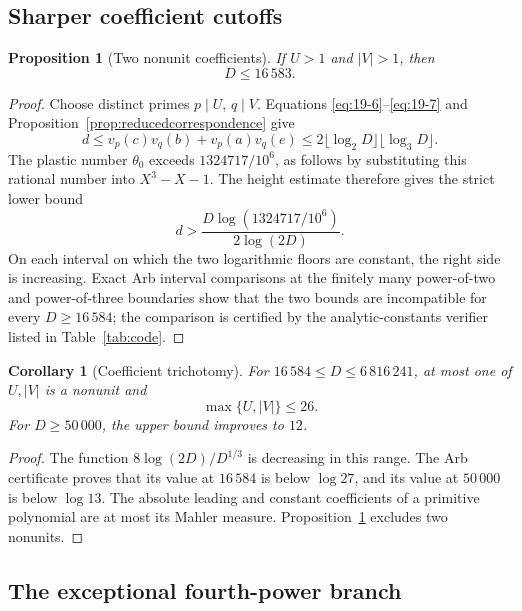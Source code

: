 \documentclass[11pt]{article}
\numberwithin{equation}{section}
\newtheorem{proposition}[theorem]{Proposition}
\newtheorem{corollary}[theorem]{Corollary}
\theoremstyle{definition}
\begin{document}
\subsection{Sharper coefficient cutoffs}

\begin{proposition}[Two nonunit coefficients]\label{prop:twononunit}
If \(U>1\) and \(|V|>1\), then
\begin{equation}
 \boxed{D\leq16\,583.}
 \label{eq:19-9}
\end{equation}
\end{proposition}

\begin{proof}
Choose distinct primes \(p\mid U\), \(q\mid V\).  Equations
\eqref{eq:19-6}--\eqref{eq:19-7} and Proposition~\ref{prop:reducedcorrespondence} give
\[
 d\leq v_p(c)v_q(b)+v_p(a)v_q(e)
 \leq2\lfloor\log_2D\rfloor\lfloor\log_3D\rfloor.
\]
The plastic number \(\theta_0\) exceeds
\(1324717/10^6\), as follows by substituting this rational number into
\(X^3-X-1\).  The height estimate therefore gives the strict lower bound
\[
 d>
 \frac{D\log(1324717/10^6)}{2\log(2D)}.
\]
On each interval on which the two logarithmic floors are constant, the right
side is increasing.  Exact Arb interval comparisons at the finitely many
power-of-two and power-of-three boundaries show that the two bounds are
incompatible for every \(D\geq16\,584\); the comparison is certified by the
analytic-constants verifier listed in Table~\ref{tab:code}.
\end{proof}

\begin{corollary}[Coefficient trichotomy]\label{cor:coefftrichotomy}
For \(16\,584\leq D\leq6\,816\,241\), at most one of \(U,|V|\) is a
nonunit and
\[
 \max\{U,|V|\}\leq26.
\]
For \(D\geq50\,000\), the upper bound improves to \(12\).
\end{corollary}

\begin{proof}
The function \(8\log(2D)/D^{1/3}\) is decreasing in this range.  The Arb
certificate proves that its value at \(16\,584\) is below \(\log27\), and
its value at \(50\,000\) is below \(\log13\).  The absolute leading and
constant coefficients of a primitive polynomial are at most its Mahler
measure.  Proposition~\ref{prop:twononunit} excludes two nonunits.
\end{proof}

\subsection{The exceptional fourth-power branch}
\end{document}
